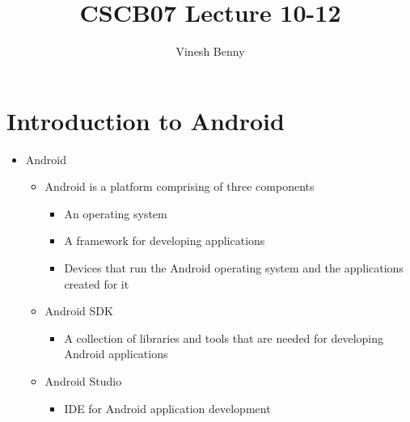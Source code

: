 \documentclass[11pt]{article}
\title{CSCB07 Lecture 10-12}
\author{Vinesh Benny}
\begin{document}
\section*{Introduction to Android}
\begin{itemize}
	\item Android
		\begin{itemize}
			\item Android is a platform comprising of three components
				\begin{itemize}
					\item An operating system
					\item A framework for developing applications
					\item Devices that run the Android operating system and the applications created
					for it
				\end{itemize}
			\item Android SDK
				\begin{itemize}
					\item A collection of libraries and tools that are needed for developing Android applications
				\end{itemize}
			\item Android Studio
				\begin{itemize}
					\item IDE for Android application development
				\end{itemize}
		\end{itemize}


\end{itemize}
\end{document}
